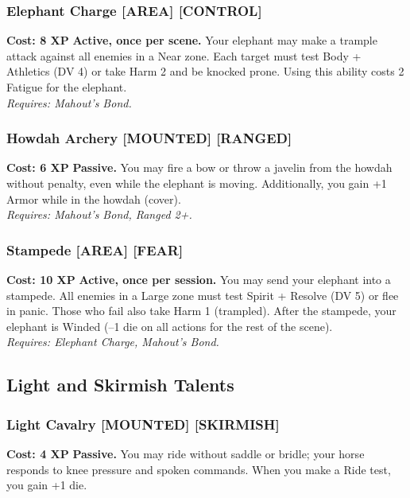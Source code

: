 \documentclass[12pt,a4paper]{book}
\begin{document}
\subsubsection*{Elephant Charge \textnormal{[AREA] [CONTROL]}}
\label{talent:elephant-charge}
\textbf{Cost: 8 XP} \textbf{Active, once per scene.} Your elephant may make a trample attack against all enemies in a Near zone. Each target must test Body + Athletics (DV 4) or take Harm 2 and be knocked prone. Using this ability costs 2 Fatigue for the elephant. \\
\textit{Requires: Mahout's Bond.}

\subsubsection*{Howdah Archery \textnormal{[MOUNTED] [RANGED]}}
\label{talent:howdah-archery}
\textbf{Cost: 6 XP} \textbf{Passive.} You may fire a bow or throw a javelin from the howdah without penalty, even while the elephant is moving. Additionally, you gain +1 Armor while in the howdah (cover). \\
\textit{Requires: Mahout's Bond, Ranged 2+.}

\subsubsection*{Stampede \textnormal{[AREA] [FEAR]}}
\label{talent:stampede}
\textbf{Cost: 10 XP} \textbf{Active, once per session.} You may send your elephant into a stampede. All enemies in a Large zone must test Spirit + Resolve (DV 5) or flee in panic. Those who fail also take Harm 1 (trampled). After the stampede, your elephant is Winded (--1 die on all actions for the rest of the scene). \\
\textit{Requires: Elephant Charge, Mahout's Bond.}

\subsection*{Light and Skirmish Talents}
\label{sec:major-light}

\subsubsection*{Light Cavalry \textnormal{[MOUNTED] [SKIRMISH]}}
\label{talent:light-cavalry}
\textbf{Cost: 4 XP} \textbf{Passive.} You may ride without saddle or bridle; your horse responds to knee pressure and spoken commands. When you make a Ride test, you gain +1 die.
\end{document}
